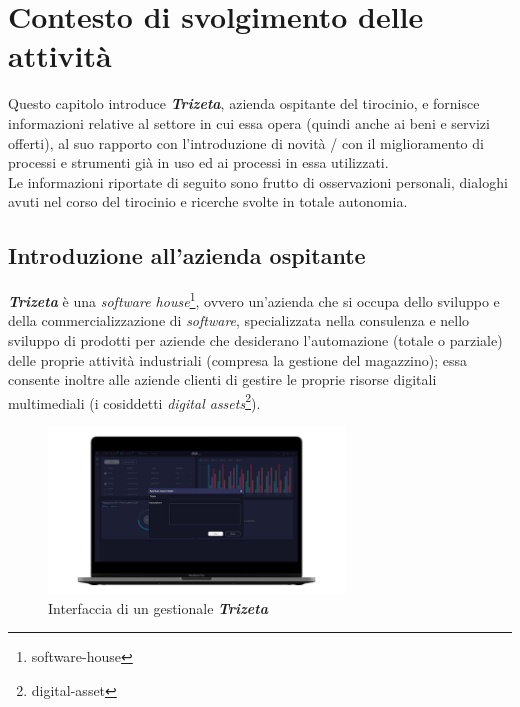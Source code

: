 \chapter{Contesto di svolgimento delle attività}
\label{cap:contesto-svolgimento}

Questo capitolo introduce \textit{\textbf{Trizeta}}, azienda ospitante del tirocinio, e fornisce informazioni relative al settore in cui essa opera (quindi anche ai beni e servizi offerti), 
al suo rapporto con l'introduzione di novità / con il miglioramento di processi e strumenti già in uso ed ai processi in essa utilizzati. \\
Le informazioni riportate di seguito sono frutto di osservazioni personali, dialoghi avuti nel corso del tirocinio e ricerche svolte in totale autonomia.

\section{Introduzione all'azienda ospitante}

\textit{\textbf{Trizeta}} è una \textit{software house}\footnote{\gls{software-house}}, ovvero un'azienda che si occupa dello sviluppo e della commercializzazione di \textit{software}, specializzata nella consulenza e nello sviluppo
di prodotti per aziende che desiderano l'automazione (totale o parziale) delle proprie attività industriali (compresa la gestione del magazzino); essa consente inoltre alle aziende clienti di gestire le proprie risorse digitali multimediali (i cosiddetti \textit{digital assets}\footnote{\gls{digital-asset}}).
    \begin{figure}[H]
        \centering
        \includegraphics[width=0.7\textwidth]{images/adesuite.png}
        \caption[Interfaccia di un gestionale \textit{\textbf{Trizeta}}]{Interfaccia di un gestionale \textit{\textbf{Trizeta}}\footnotemark}
    \end{figure}

